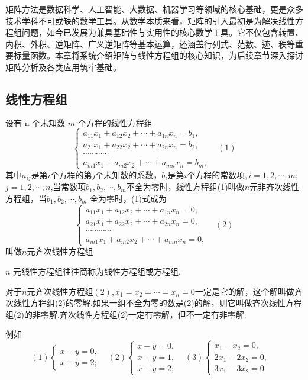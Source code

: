 矩阵方法是数据科学、人工智能、大数据、机器学习等领域的核心基础，更是众多技术学科不可或缺的数学工具。从数学本质来看，矩阵的引入最初是为解决线性方程组问题，如今已发展为兼具基础性与实用性的核心数学工具。它不仅包含转置、内积、外积、逆矩阵、广义逆矩阵等基本运算，还涵盖行列式、范数、迹、秩等重要标量函数。本章将系统介绍矩阵与线性方程组的核心知识，为后续章节深入探讨矩阵分析及各类应用筑牢基础。

\subsection{线性方程组}

$\text{设有 n 个未知数 }m\text{ 个方程的线性方程组}$
\[\begin{cases}a_{11}x_{1}+a_{12}x_{2}+\cdots+a_{1n}x_{n}=b_{1},\\a_{21}x_{1}+a_{22}x_{2}+\cdots+a_{2n}x_{n}=b_{2},\\\cdots\cdots\cdots\cdots\\a_{m1}x_{1}+a_{m2}x_{2}+\cdots+a_{mn}x_{n}=b_{m},&\end{cases} (1)\]
其中$a_{ij}$是第$i$个方程的第$j$个未知数的系数，$b_i$是第$i$个方程的常数项$,i=1,2,\cdots,m;$ $j=1,2,\cdots,n$,当常数项$b_{1},b_{2},\cdots,b_{m}$不全为零时，线性方程组(1)叫做$n$元非齐次线性方程组，当$b_1,b_2,\cdots,b_m$ 全为零时，(1)式成为
\[\begin{cases}a_{11}x_{1}+a_{12}x_{2}+\cdots+a_{1n}x_{n}=0,\\a_{21}x_{1}+a_{22}x_{2}+\cdots+a_{2n}x_{n}=0,\\\cdots\cdots\cdots\cdots\\a_{m1}x_{1}+a_{m2}x_{2}+\cdots+a_{mn}x_{n}=0,&\end{cases}(2)\]
叫做$n$元齐次线性方程组

$n$ 元线性方程组往往简称为线性方程组或方程组.

对于$n$元齐次线性方程组$(2),x_1=x_2=\cdots=x_n=0$一定是它的解，这个解叫做齐次线性方程组(2)的零解.如果一组不全为零的数是(2)的解，则它叫做齐次线性方程组(2)的非零解.齐次线性方程组(2)一定有零解，但不一定有非零解.

例如
$$(1)\begin{cases}x-y=0,\\x+y=2;&\end{cases}(2)\begin{cases}x-y=0,\\x+y=1,\\x+y=2;&\end{cases}(3)\begin{cases}x_1-x_2=0,\\2x_1-2x_2=0,\\3x_1-3x_2=0&\end{cases}$$

